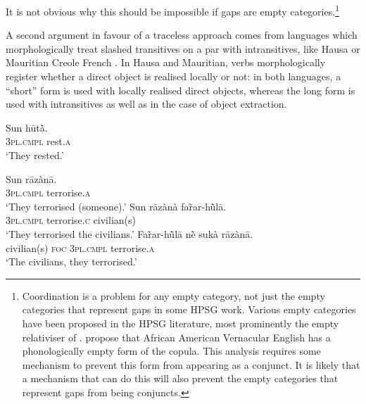 \documentclass[output=paper
                ,modfonts
                ,nonflat
	        ,collection
	        ,collectionchapter
	        ,collectiontoclongg
 	        ,biblatex
                ,babelshorthands
                ,newtxmath
                ,draftmode
                ,colorlinks, citecolor=brown
]{./langsci/langscibook}
\begin{document}
{\begin{exe} \ex \begin{xlist} \label{ex:UDC:22}

\end{xlist}
\end{exe}

\noindent
It is not obvious why this should be impossible if gaps are empty
categories.\footnote{Coordination is a problem for any empty category,
  not just the empty categories that represent gaps in some HPSG
  work. Various empty categories have been proposed in the HPSG
  literature, most prominently the empty relativiser of
  \citet{Pollard:Sag:94}. \citet[sec.~15.3.5]{Sag:Wasow:ea:03}
  propose that African American Vernacular English has a
  phonologically empty form of the copula. This analysis requires some
  mechanism to prevent this form from appearing as a conjunct. It is
  likely that a mechanism that can do this will also prevent the empty
  categories that represent gaps from being conjuncts.
  
 }

A second argument in favour of a traceless approach comes from
languages which morphologically treat slashed transitives on a par
with intransitives, like Hausa \citep{crysmann_b04yom} or Mauritian
Creole French \citep{Henri10}. In Hausa and Mauritian, verbs
morphologically register whether a direct object is realised locally
or not: in both languages, a ``short'' form is used with locally
realised direct objects, whereas the long form is used with
intransitives as well as in the case of object extraction.

\begin{exe}

  \ex \gll Sun hūtā̀.\\
  \textsc{3pl.cmpl} rest.\textsc{a}\\
  \glt `They rested.' \label{ex:UDC:Hau:intr}
  \ex \label{ex:UDC:Hau:tr}
  \begin{xlist}
    \ex \gll Sun rāzànā.\\
    \textsc{3pl.cmpl} terrorise.\textsc{a}\\
    \glt `They terrorised (someone).' \hfill \citep[632]{newman_p00}
    \ex \gll Sun rāzànà far̃ar-hū̀lā.\\
    \textsc{3pl.cmpl} terrorise.\textsc{c} civilian(s)\\
    \glt `They terrorised the civilians.' \hfill \citep[632]{newman_p00}
    \ex \gll Far̃ar-hū̀lā nḕ sukà rāzànā.\\
    civilian(s) \textsc{foc} \textsc{3pl.cmpl} terrorise.\textsc{a}\\
    \glt `The civilians, they terrorised.' 
  \end{xlist}
  

\end{exe}}
\end{document}
